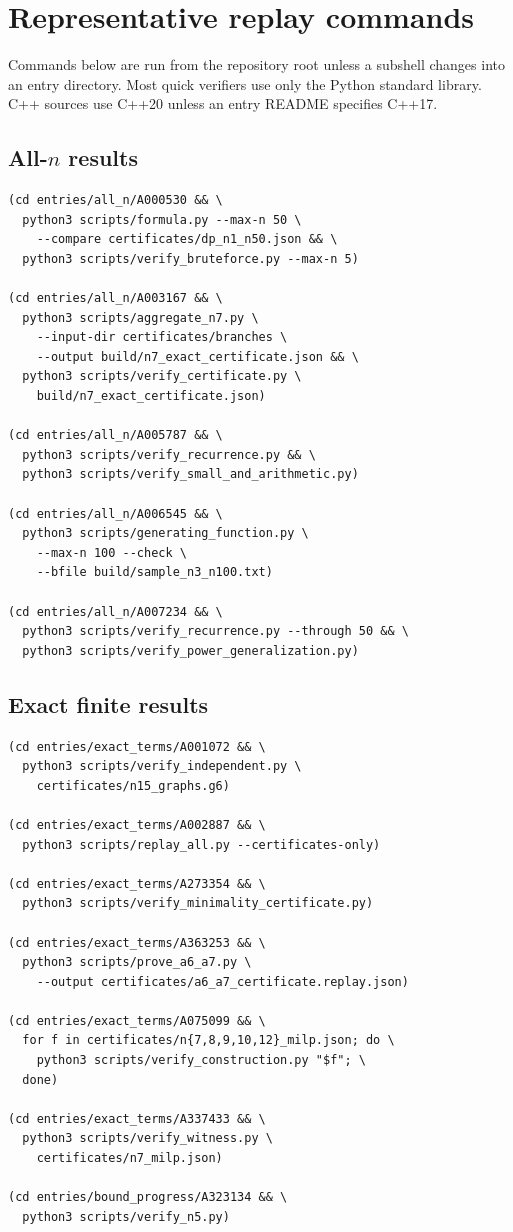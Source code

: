 \section{Representative replay commands}
\label{app:replay}

Commands below are run from the repository root unless a subshell changes
into an entry directory.  Most quick verifiers use only the Python standard
library.  C++ sources use C++20 unless an entry README specifies C++17.

\subsection{\texorpdfstring{All-\(n\)}{All-n} results}

\begin{lstlisting}[style=repo]
(cd entries/all_n/A000530 && \
  python3 scripts/formula.py --max-n 50 \
    --compare certificates/dp_n1_n50.json && \
  python3 scripts/verify_bruteforce.py --max-n 5)

(cd entries/all_n/A003167 && \
  python3 scripts/aggregate_n7.py \
    --input-dir certificates/branches \
    --output build/n7_exact_certificate.json && \
  python3 scripts/verify_certificate.py \
    build/n7_exact_certificate.json)

(cd entries/all_n/A005787 && \
  python3 scripts/verify_recurrence.py && \
  python3 scripts/verify_small_and_arithmetic.py)

(cd entries/all_n/A006545 && \
  python3 scripts/generating_function.py \
    --max-n 100 --check \
    --bfile build/sample_n3_n100.txt)

(cd entries/all_n/A007234 && \
  python3 scripts/verify_recurrence.py --through 50 && \
  python3 scripts/verify_power_generalization.py)
\end{lstlisting}

\subsection{Exact finite results}

\begin{lstlisting}[style=repo]
(cd entries/exact_terms/A001072 && \
  python3 scripts/verify_independent.py \
    certificates/n15_graphs.g6)

(cd entries/exact_terms/A002887 && \
  python3 scripts/replay_all.py --certificates-only)

(cd entries/exact_terms/A273354 && \
  python3 scripts/verify_minimality_certificate.py)

(cd entries/exact_terms/A363253 && \
  python3 scripts/prove_a6_a7.py \
    --output certificates/a6_a7_certificate.replay.json)

(cd entries/exact_terms/A075099 && \
  for f in certificates/n{7,8,9,10,12}_milp.json; do \
    python3 scripts/verify_construction.py "$f"; \
  done)

(cd entries/exact_terms/A337433 && \
  python3 scripts/verify_witness.py \
    certificates/n7_milp.json)

(cd entries/bound_progress/A323134 && \
  python3 scripts/verify_n5.py)
\end{lstlisting}

